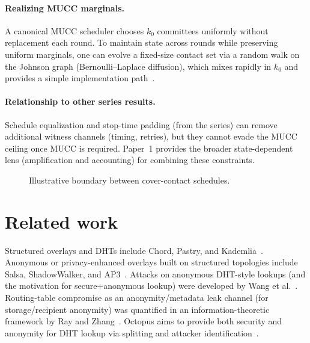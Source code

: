 \documentclass[11pt]{article}
\begin{document}
\paragraph{Realizing MUCC marginals.}
A canonical MUCC scheduler chooses $k_0$ committees uniformly without replacement each round.
To maintain state across rounds while preserving uniform marginals, one can evolve a fixed-size contact set via a random walk on the Johnson graph (Bernoulli--Laplace diffusion), which mixes rapidly in $k_0$ and provides a simple implementation path~\cite{diaconis1987bernoulliLaplace}.

\paragraph{Relationship to other series results.}
Schedule equalization and stop-time padding (from the series) can remove additional witness channels (timing, retries), but they cannot evade the MUCC ceiling once MUCC is required.
Paper~1 provides the broader state-dependent lens (amplification and accounting) for combining these constraints.

\begin{figure}[t]
  \centering
  \caption{Illustrative boundary between cover-contact schedules.}
\end{figure}


\section{Related work}
Structured overlays and DHTs include Chord, Pastry, and Kademlia~\cite{stoica2001chord,rowstron2001pastry,maymounkov2002kademlia}.
Anonymous or privacy-enhanced overlays built on structured topologies include Salsa, ShadowWalker, and AP3~\cite{nambiar2006salsa,mittal2009shadowwalker,mislove2006ap3}.
Attacks on anonymous DHT-style lookups (and the motivation for secure+anonymous lookup) were developed by Wang et al.~\cite{wang2010anonymousLookupAttacks,mittal2012informationleaks}.
Routing-table compromise as an anonymity/metadata leak channel (for storage/recipient anonymity) was quantified in an information-theoretic framework by Ray and Zhang~\cite{ray2007itframework}.
Octopus aims to provide both security and anonymity for DHT lookup via splitting and attacker identification~\cite{wang2012octopus}.
\end{document}
